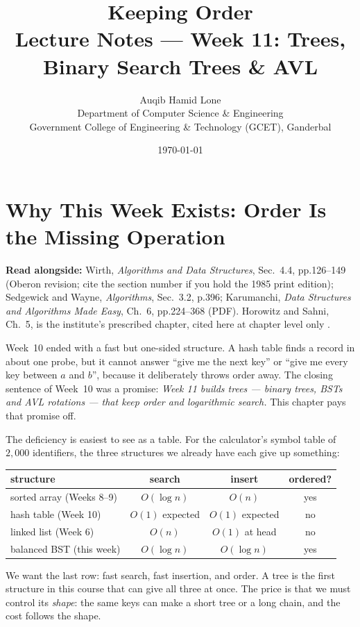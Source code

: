 \documentclass[11pt]{article}
\title{Keeping Order\\\large Lecture Notes --- Week 11: Trees, Binary Search
  Trees \& AVL}
\author{Auqib Hamid Lone\\[0.3em]
  \small Department of Computer Science \& Engineering\\
  \small Government College of Engineering \& Technology (GCET), Ganderbal}
\date{\today}
\theoremstyle{definition}
\begin{document}
\maketitle

\section{Why This Week Exists: Order Is the Missing Operation}

\textbf{Read alongside:} Wirth, \textit{Algorithms and Data Structures},
Sec.~4.4, pp.126--149 (Oberon revision; cite the section number if you hold
the 1985 print edition); Sedgewick and Wayne, \textit{Algorithms}, Sec.~3.2,
p.396; Karumanchi, \textit{Data Structures and Algorithms Made Easy}, Ch.~6,
pp.224--368 (PDF). Horowitz and Sahni, Ch.~5, is the institute's prescribed
chapter, cited here at chapter level only
\cite[Ch.~5]{HorowitzSahni2008_fundamentals_data_structures}.

Week~10 ended with a fast but one-sided structure. A hash table finds a
record in about one probe, but it cannot answer ``give me the next key'' or
``give me every key between $a$ and $b$'', because it deliberately throws
order away. The closing sentence of Week~10 was a promise: \emph{Week 11
builds trees --- binary trees, BSTs and AVL rotations --- that keep order and
logarithmic search.} This chapter pays that promise off.

The deficiency is easiest to see as a table. For the calculator's symbol
table of $2{,}000$ identifiers, the three structures we already have each
give up something:

\begin{center}
{\footnotesize
\begin{tabular}{l c c c}
  \toprule
  \textbf{structure} & \textbf{search} & \textbf{insert} & \textbf{ordered?} \\
  \midrule
  sorted array (Weeks 8--9) & $O(\log n)$ & $O(n)$ & yes \\
  hash table (Week 10)      & $O(1)$ expected & $O(1)$ expected & no \\
  linked list (Week 6)      & $O(n)$ & $O(1)$ at head & no \\
  \midrule
  balanced BST (this week)  & $O(\log n)$ & $O(\log n)$ & yes \\
  \bottomrule
\end{tabular}}
\end{center}

We want the last row: fast search, fast insertion, and order. A tree is the
first structure in this course that can give all three at once. The price is
that we must control its \emph{shape}: the same keys can make a short tree or
a long chain, and the cost follows the shape.
\end{document}
